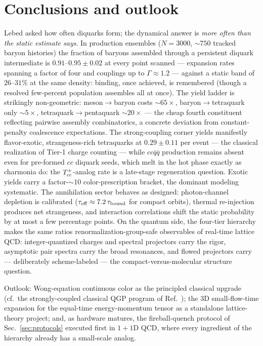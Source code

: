 \section{Conclusions and outlook}
\label{sec:conclusions}

Lebed asked how often diquarks form; the dynamical answer is
\emph{more often than the static estimate says}.  In production
ensembles ($N=3000$, $\sim750$ tracked baryon histories) the fraction
of baryons assembled through a persistent diquark intermediate is
$0.91$--$0.95\pm0.02$ at every point scanned --- expansion rates
spanning a factor of four and couplings up to $\Gamma\approx1.2$ ---
against a static band of $26$--$31\%$ at the same density: binding,
once achieved, is remembered (though a resolved few-percent population
assembles all at once).  The yield ladder is strikingly non-geometric:
meson$\to$baryon costs $\sim65\times$, baryon$\to$tetraquark only
$\sim5\times$, tetraquark$\to$pentaquark $\sim20\times$ --- the cheap
fourth constituent reflecting pairwise assembly combinatorics, a
concrete deviation from constant-penalty coalescence expectations.
The strong-coupling corner yields manifestly flavor-exotic,
strangeness-rich tetraquarks at $0.29\pm0.11$ per event --- the
classical realization of Tier-1 charge counting --- while
$cc\bar q\bar q$ production remains absent even for pre-formed $cc$
diquark seeds, which melt in the hot phase exactly as charmonia do:
the $T_{cc}^{+}$-analog rate is a late-stage regeneration question.  Exotic
yields carry a factor-$\sim$10 color-prescription bracket, the
dominant modeling systematic.  The
annihilation sector behaves as designed: photon-channel depletion is
calibrated ($\tau_{\rm eff}\approx7.2\,\tau_{\rm bound}$ for compact
orbits), thermal re-injection produces net strangeness, and interaction
correlations shift the static probability by at most a few percentage
points.  On the quantum side, the four-tier hierarchy makes the same
ratios renormalization-group-safe observables of real-time lattice QCD:
integer-quantized charges and spectral projectors carry the rigor,
asymptotic pair spectra carry the broad resonances, and flowed
projectors carry --- deliberately scheme-labeled --- the
compact-versus-molecular structure question.

Outlook: Wong-equation continuous color as the principled classical
upgrade (cf.\ the strongly-coupled classical QGP program of
Ref.~\cite{Gelman:2006xw}); the 3D small-flow-time expansion for the equal-time
energy-momentum tensor as a standalone lattice-theory project; and, as
hardware matures, the fireball-quench protocol of
Sec.~\ref{sec:protocols} executed first in $1{+}1$D QCD, where every
ingredient of the hierarchy already has a small-scale analog.
